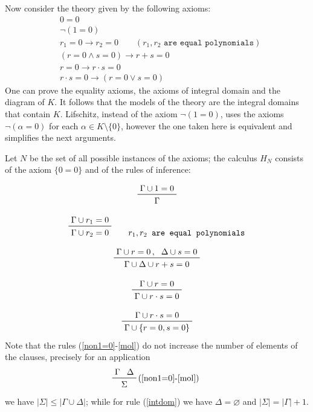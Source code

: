 \documentclass[a4paper,12pt,oneside]{book}
\let\emptyset\varnothing
\let\o\vee
\let\e\wedge
\begin{document}
\noindent Now consider the theory given by the following axioms:
\begin{eqnarray}
& 0=0  \label{ax00} \\
& \neg (1 =0) \\
& r_1=0 \rightarrow r_2 =0 \qquad (r_1,r_2 \texttt{ are equal polynomials}) \\
& ( r=0 \e s=0) \rightarrow r+s=0 \\
& r=0 \rightarrow r\cdot s=0 \\
& r\cdot s=0 \rightarrow (r=0 \o s=0) \label{axintdom}
\end{eqnarray}
One can prove the equality axioms, the axioms of integral domain and the diagram of $K$. It follows that the models of the theory are the integral domains that contain $K$. Lifschitz, instead of the axiom $\neg (1=0)$, uses the axioms  $\neg (\alpha =0)$ for each $\alpha\in K\setminus \{0\}$, however the one taken here is equivalent and simplifies the next arguments.  

Let $N$ be the set of all possible instances of the axioms; the calculus $H_N$ consists of the axiom $\{0=0\}$ and of the rules of inference:

\begin{equation}\label{non1=0}
\prftree{\Gamma \cup 1=0}{\Gamma}
\end{equation}

\begin{equation}\label{eqpoly}
\prftree{\Gamma \cup r_1=0 } { \Gamma \cup r_2=0 } \qquad r_1,r_2\texttt{ are equal polynomials}
\end{equation}

\begin{equation}\label{somm}
\prftree{\Gamma \cup r=0 \, ,}{\Delta \cup s=0}{\Gamma \cup \Delta \cup r+s=0 } 
\end{equation}

\begin{equation} \label{mol}
\prftree{\Gamma \cup r=0}{\Gamma \cup r\cdot s=0 } 
\end{equation}

\begin{equation} \label{intdom}
\prftree{\Gamma \cup r\cdot s=0}{\Gamma \cup  \{r=0,s=0\} } 
\end{equation}
Note that the rules (\ref{non1=0}-\ref{mol}) do not increase the number of elements of the clauses, precisely for an application 
$$
\prftree[r]{(\ref{non1=0}-\ref{mol}) } {\Gamma}{\Delta}{\hspace{2mm}\Sigma\hspace{2mm}}
$$
we have $ |\Sigma| \leq   |\Gamma\cup\Delta|$; while for rule (\ref{intdom})
we have $\Delta = \emptyset$ and  $ |\Sigma| =   |\Gamma| +1 $. \\
\end{document}
